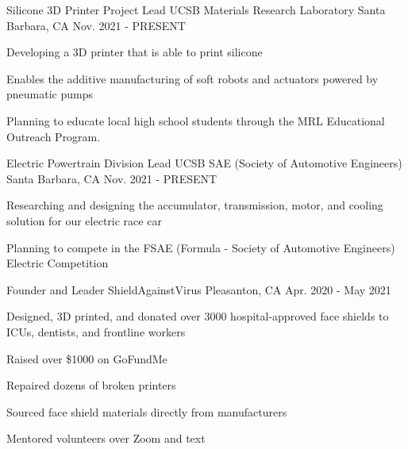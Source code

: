 


\begin{cventries}
\cventry
{Silicone 3D Printer Project Lead} %
{UCSB Materials Research Laboratory} %
{Santa Barbara, CA} %
{Nov. 2021 - PRESENT} %
{ %
\begin{cvitems}
\item {Developing a 3D printer that is able to print silicone}
\item {Enables the additive manufacturing of soft robots and actuators powered by pneumatic pumps}
\item {Planning to educate local high school students through the MRL Educational Outreach Program.}
\end{cvitems}
}


\cventry
{Electric Powertrain Division Lead} %
{UCSB SAE (Society of Automotive Engineers)} %
{Santa Barbara, CA} %
{Nov. 2021 - PRESENT} %
{ %
\begin{cvitems}
\item {Researching and designing the accumulator, transmission, motor, and cooling solution for our electric race car}
\item {Planning to compete in the FSAE (Formula - Society of Automotive Engineers) Electric Competition}
\end{cvitems}
}


\cventry
{Founder and Leader} %
{ShieldAgainstVirus} %
{Pleasanton, CA} %
{Apr. 2020 - May 2021} %
{ %
\begin{cvitems}
\item {Designed, 3D printed, and donated over 3000 hospital-approved face shields to ICUs, dentists, and frontline workers}
\item {Raised over \$1000 on GoFundMe}
\item {Repaired dozens of broken printers}
\item {Sourced face shield materials directly from manufacturers}
\item {Mentored volunteers over Zoom and text}
\end{cvitems}
}


\end{cventries}
